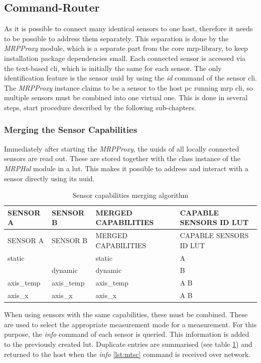 \hypertarget{command-router}{%
\subsection{Command-Router}\label{command-router}}

As it is possible to connect many identical sensors to one host,
therefore it needs to be possible to address them separately. This
separation is done by the \emph{MRPProxy} module, which is a separate
part from the core \gls{mrp}-library, to keep installation package
dependencies small. Each connected sensor is accessed via the text-based
\gls{cli}, which is initially the same for each sensor. The only
identification feature is the sensor \gls{uuid} by using the \emph{id}
command of the sensor \gls{cli}. The \emph{MRPProxy} instance claims to
be a sensor to the host \gls{pc} running \gls{mrp} \gls{cli}, so
multiple sensors must be combined into one virtual one. This is done in
several steps, start procedure described by the following sub-chapters.

\hypertarget{merging-the-sensor-capabilities}{%
\subsubsection{Merging the Sensor
Capabilities}\label{merging-the-sensor-capabilities}}

Immediately after starting the \emph{MRPProxy}, the \gls{uuid}s of all
locally connected sensors are read out. These are stored together with
the class instance of the \emph{MRPHal} module in a \gls{lut}. This
makes it possible to address and interact with a sensor directly using
its \gls{uuid}.

\begin{longtable}[]{@{}llll@{}}
\caption{Sensor capabilities merging algorithm
\label{Sensor_capabilities_merging_algorithm.csv}}\tabularnewline
\toprule
SENSOR A & SENSOR B & MERGED CAPABILITIES & CAPABLE SENSORS ID
LUT\tabularnewline
\midrule
\endfirsthead
\toprule
SENSOR A & SENSOR B & MERGED CAPABILITIES & CAPABLE SENSORS ID
LUT\tabularnewline
\midrule
\endhead
static & & static & A\tabularnewline
& dynamic & dynamic & B\tabularnewline
axis\_temp & axis\_temp & axis\_temp & A B\tabularnewline
axis\_x & axis\_x & axis\_x & A B\tabularnewline
\bottomrule
\end{longtable}

When using sensors with the same capabilities, these must be combined.
These are used to select the appropriate measurement mode for a
measurement. For this purpose, the \emph{info} command of each sensor is
queried. This information is added to the previously created \gls{lut}.
Duplicate entries are summarised (see table
\ref{Sensor_capabilities_merging_algorithm.csv}) and returned to the
host when the \emph{info} \ref{lst:mtsc} command is received over
network.

